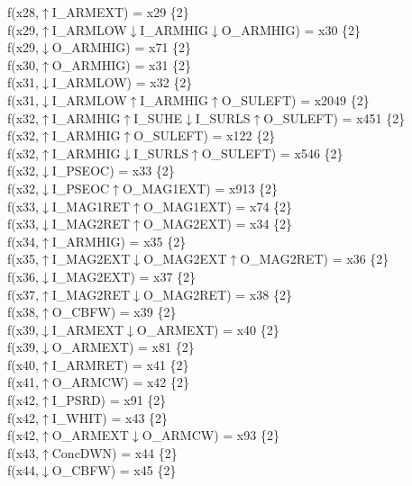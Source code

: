 f(x28,$\uparrow$I\_ARMEXT) = x29 \{2\} \\  
f(x29,$\uparrow$I\_ARMLOW$\downarrow$I\_ARMHIG$\downarrow$O\_ARMHIG) = x30 \{2\} \\  
f(x29,$\downarrow$O\_ARMHIG) = x71 \{2\} \\  
f(x30,$\uparrow$O\_ARMHIG) = x31 \{2\} \\  
f(x31,$\downarrow$I\_ARMLOW) = x32 \{2\} \\  
f(x31,$\downarrow$I\_ARMLOW$\uparrow$I\_ARMHIG$\uparrow$O\_SULEFT) = x2049 \{2\} \\  
f(x32,$\uparrow$I\_ARMHIG$\uparrow$I\_SUHE$\downarrow$I\_SURLS$\uparrow$O\_SULEFT) = x451 \{2\} \\  
f(x32,$\uparrow$I\_ARMHIG$\uparrow$O\_SULEFT) = x122 \{2\} \\  
f(x32,$\uparrow$I\_ARMHIG$\downarrow$I\_SURLS$\uparrow$O\_SULEFT) = x546 \{2\} \\  
f(x32,$\downarrow$I\_PSEOC) = x33 \{2\} \\  
f(x32,$\downarrow$I\_PSEOC$\uparrow$O\_MAG1EXT) = x913 \{2\} \\  
f(x33,$\downarrow$I\_MAG1RET$\uparrow$O\_MAG1EXT) = x74 \{2\} \\  
f(x33,$\downarrow$I\_MAG2RET$\uparrow$O\_MAG2EXT) = x34 \{2\} \\  
f(x34,$\uparrow$I\_ARMHIG) = x35 \{2\} \\  
f(x35,$\uparrow$I\_MAG2EXT$\downarrow$O\_MAG2EXT$\uparrow$O\_MAG2RET) = x36 \{2\} \\  
f(x36,$\downarrow$I\_MAG2EXT) = x37 \{2\} \\  
f(x37,$\uparrow$I\_MAG2RET$\downarrow$O\_MAG2RET) = x38 \{2\} \\  
f(x38,$\uparrow$O\_CBFW) = x39 \{2\} \\  
f(x39,$\downarrow$I\_ARMEXT$\downarrow$O\_ARMEXT) = x40 \{2\} \\  
f(x39,$\downarrow$O\_ARMEXT) = x81 \{2\} \\  
f(x40,$\uparrow$I\_ARMRET) = x41 \{2\} \\  
f(x41,$\uparrow$O\_ARMCW) = x42 \{2\} \\  
f(x42,$\uparrow$I\_PSRD) = x91 \{2\} \\  
f(x42,$\uparrow$I\_WHIT) = x43 \{2\} \\  
f(x42,$\uparrow$O\_ARMEXT$\downarrow$O\_ARMCW) = x93 \{2\} \\  
f(x43,$\uparrow$ConcDWN) = x44 \{2\} \\  
f(x44,$\downarrow$O\_CBFW) = x45 \{2\} \\  
